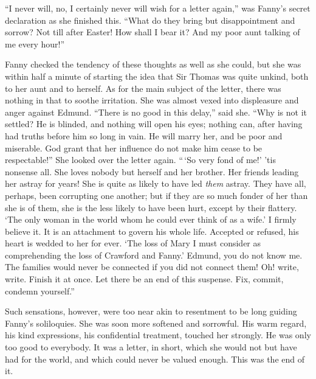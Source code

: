``I never will, no, I certainly never will wish for a
letter again,'' was Fanny's secret declaration as she
finished this.  ``What do they bring but disappointment
and sorrow?  Not till after Easter!  How shall I bear it?
And my poor aunt talking of me every hour!''

Fanny checked the tendency of these thoughts as well as
she could, but she was within half a minute of starting
the idea that Sir Thomas was quite unkind, both to her aunt
and to herself.  As for the main subject of the letter,
there was nothing in that to soothe irritation.  She was
almost vexed into displeasure and anger against Edmund.
``There is no good in this delay,'' said she.  ``Why is not
it settled?  He is blinded, and nothing will open his eyes;
nothing can, after having had truths before him so long
in vain.  He will marry her, and be poor and miserable.
God grant that her influence do not make him cease
to be respectable!''  She looked over the letter again.
``\,`So very fond of me!' 'tis nonsense all.  She loves
nobody but herself and her brother.  Her friends leading
her astray for years!  She is quite as likely to have led
\emph{them} astray.  They have all, perhaps, been corrupting
one another; but if they are so much fonder of her than
she is of them, she is the less likely to have been hurt,
except by their flattery.  `The only woman in the world
whom he could ever think of as a wife.'  I firmly
believe it.  It is an attachment to govern his whole life.
Accepted or refused, his heart is wedded to her for ever.
`The loss of Mary I must consider as comprehending the loss
of Crawford and Fanny.'  Edmund, you do not know me.
The families would never be connected if you did not
connect them!  Oh! write, write.  Finish it at once.
Let there be an end of this suspense.  Fix, commit,
condemn yourself.''

Such sensations, however, were too near akin to
resentment to be long guiding Fanny's soliloquies.
She was soon more softened and sorrowful.  His warm regard,
his kind expressions, his confidential treatment,
touched her strongly.  He was only too good to everybody.
It was a letter, in short, which she would not but have had
for the world, and which could never be valued enough.
This was the end of it.

